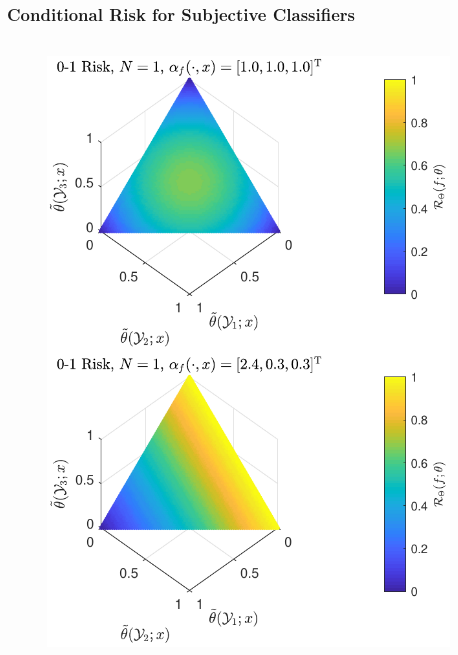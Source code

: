 \documentclass{beamer}
\begin{document}
\begin{frame}
\frametitle{Conditional Risk for Subjective Classifiers}

\begin{columns}[c]

\begin{column}{.5\linewidth}

\begin{figure}
\centering
\includegraphics[width=1\linewidth]{Risk_cond_01_Dir_theta_sub_mu.pdf}
\label{fig:Risk_cond_01_Dir_theta_sub_mu}
\end{figure}

\end{column}

\begin{column}{.5\linewidth}


\end{column}
\end{columns}
\end{frame}
\end{document}
